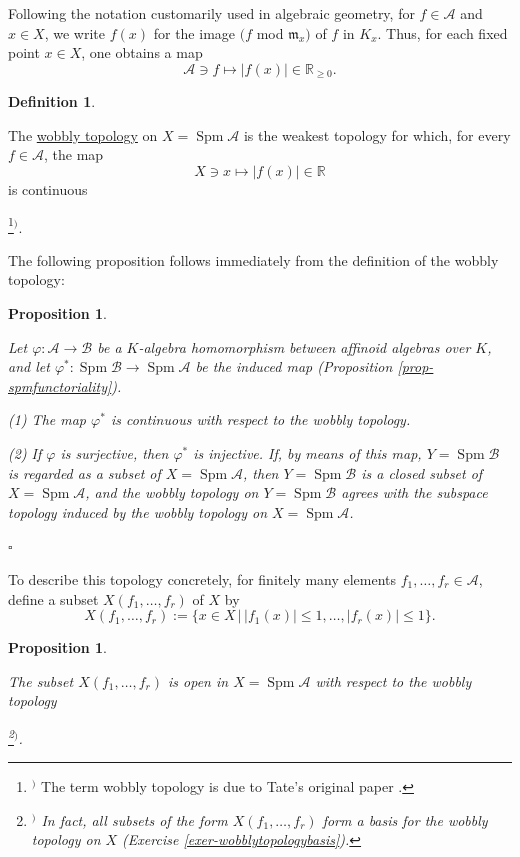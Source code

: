 \documentclass[a4paper,12pt, dvipdfmx]{jsbook}
\def\R{\mathbb{R}}
\def\m{\mathfrak{m}}
\def\Spm{\mathop{\mathrm{Spm}}\nolimits}
\newcommand{\abs}[1]{\lvert#1\rvert}
\theoremstyle{plain}
\newtheorem{prop}[thm]{\bfseries Proposition}
\theoremstyle{definition}
\newtheorem{dfn}[thm]{\bfseries Definition}
\newcounter{chushaku}
\def\chu#1{\addtocounter{chushaku}{1}\footnote[\value{chushaku}]{${}^)$ #1}${}^)$}
\begin{document}
Following the notation customarily used in algebraic geometry, for $f\in\mathcal{A}$ and $x\in X$, we write $f(x)$ for the image $(f$ mod $\m_x)$ of $f$ in $K_x$.
Thus, for each fixed point $x\in X$, one obtains a map
$$
\mathcal{A}\ni f\longmapsto\abs{f(x)}\in\R_{\geq 0}.
$$

\begin{dfn}\label{dfn-wobblytopology}{\rm 
The \underline{wobbly topology} on $X=\Spm\mathcal{A}$ is the weakest topology for which, for every $f\in\mathcal{A}$, the map
$$
X\ni x\longmapsto\abs{f(x)}\in\R
$$
is continuous\chu{The term wobbly topology is due to Tate's original paper \cite[\S9]{Tate1}.}.}
\end{dfn}

The following proposition follows immediately from the definition of the wobbly topology:
\begin{prop}\label{prop-wobblytopologyrestriction}{\rm 
Let $\varphi\colon\mathcal{A}\rightarrow\mathcal{B}$ be a $K$-algebra homomorphism between affinoid algebras over $K$, and let $\varphi^{\ast}\colon\Spm\mathcal{B}\rightarrow\Spm\mathcal{A}$ be the induced map (Proposition \ref{prop-spmfunctoriality}).

(1) The map $\varphi^{\ast}$ is continuous with respect to the wobbly topology.

(2) If $\varphi$ is surjective, then $\varphi^{\ast}$ is injective. If, by means of this map, $Y=\Spm\mathcal{B}$ is regarded as a subset of $X=\Spm\mathcal{A}$, then $Y=\Spm\mathcal{B}$ is a closed subset of $X=\Spm\mathcal{A}$, and the wobbly topology on $Y=\Spm\mathcal{B}$ agrees with the subspace topology induced by the wobbly topology on $X=\Spm\mathcal{A}$.}\hfill$\square$
\end{prop}

To describe this topology concretely, for finitely many elements $f_1,\ldots,f_r\in\mathcal{A}$, define a subset $X(f_1,\ldots,f_r)$ of $X$ by
$$
X(f_1,\ldots,f_r):=\{x\in X\,|\,\abs{f_1(x)}\leq 1,\ldots,\abs{f_r(x)}\leq 1\}.
$$
\begin{prop}\label{prop-wobblytopologybases}{\rm 
The subset $X(f_1,\ldots,f_r)$ is open in $X=\Spm\mathcal{A}$ with respect to the wobbly topology\chu{In fact, all subsets of the form $X(f_1,\ldots,f_r)$ form a basis for the wobbly topology on $X$ (Exercise \ref{exer-wobblytopologybasis}).}.}
\end{prop}
\end{document}
